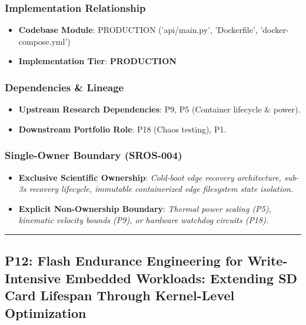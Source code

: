 \documentclass[11pt,letterpaper]{article}
\begin{document}
\subsubsection{Implementation Relationship}
\begin{itemize}[leftmargin=*]
    \item \raggedright \textbf{Codebase Module}: PRODUCTION ('api/\allowbreak main.py', 'Dockerfile', 'docker-\allowbreak compose.yml')
    \item \textbf{Implementation Tier}: \textbf{PRODUCTION}
\end{itemize}

\subsubsection{Dependencies \& Lineage}
\begin{itemize}[leftmargin=*]
    \item \textbf{Upstream Research Dependencies}: P9, P5 (Container lifecycle \& power).
    \item \textbf{Downstream Portfolio Role}: P18 (Chaos testing), P1.
\end{itemize}

\subsubsection{Single-Owner Boundary (SROS-004)}
\begin{itemize}[leftmargin=*]
    \item \textbf{Exclusive Scientific Ownership}: \textit{Cold-\allowbreak boot edge recovery architecture, sub-\allowbreak 3s recovery lifecycle, immutable containerized edge filesystem state isolation.}
    \item \textbf{Explicit Non-Ownership Boundary}: \textit{Thermal power scaling (P5), kinematic velocity bounds (P9), or hardware watchdog circuits (P18).}
\end{itemize}

\vspace{0.4cm}
\hrule

\subsection{P12: Flash Endurance Engineering for Write-\allowbreak Intensive Embedded Workloads: Extending SD Card Lifespan Through Kernel-\allowbreak Level Optimization}
\label{sec:profile_p12}
\end{document}
